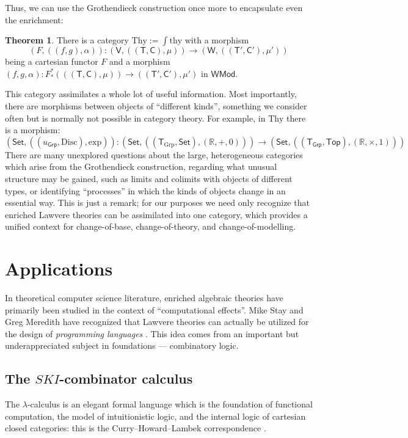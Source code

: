 \documentclass{amsart}
\theoremstyle{definition}
\newtheorem{theorem}{Theorem}
\newcommand{\Set}{\mathsf{Set}}
\newcommand{\Grp}{\mathsf{Grp}}
\newcommand{\Top}{\mathsf{Top}}
\newcommand{\Mod}{\mathsf{Mod}}
\newcommand{\V}{\mathsf{V}}
\newcommand{\W}{\mathsf{W}}
\newcommand{\C}{\mathsf{C}}
\newcommand{\T}{\mathsf{T}}
\newcommand{\maps}{\colon}
\begin{document}
Thus, we can use the Grothendieck construction once more to encapsulate even the enrichment:
\begin{theorem}
	There is a category $\mathrm{Thy} := \int \mathrm{thy}$ with a morphism $$(F,((f,g),\alpha))\maps (\V,((\T,\C),\mu)) \to (\W,((\T',\C'),\mu'))$$ being a cartesian functor $F$ and a morphism $(f,g,\alpha)\maps F_*^*(((\T,\C),\mu)) \to ((\T',\C'),\mu')$ in $\W\Mod$.
\end{theorem}

This category assimilates a whole lot of useful information. Most importantly, there are morphisms between objects of ``different kinds'', something we consider often but is normally not possible in category theory. For example, in $\mathrm{Thy}$ there is a morphism: 
\[ (\Set, ((u_{\Grp}, \mathrm{Disc}), \mathrm{exp}))\maps (\Set,((\T_{\mathrm{Grp}},\Set),(\mathbb{R},+,0))) \to (\Set,((\T_\Grp,\Top),(\mathbb{R},\times,1))) \]
There are many unexplored questions about the large, heterogeneous categories which arise from the Grothendieck construction, regarding what unusual structure may be gained, such as limits and colimits with objects of different types, or identifying ``processes'' in which the kinds of objects change in an essential way. This is just a remark; for our purposes we need only recognize that enriched Lawvere theories can be assimilated into one category, which provides a unified context for change-of-base, change-of-theory, and change-of-modelling.

\section{Applications}

In theoretical computer science literature, enriched algebraic theories have primarily been studied in the context of ``computational effects''. Mike Stay and Greg Meredith have recognized that Lawvere theories can actually be utilized for the design of \textit{programming languages} \cite{ladl}. This idea comes from an important but underappreciated subject in foundations --- combinatory logic.

\subsection{The $SKI$-combinator calculus}

The $\lambda$-calculus is an elegant formal language which is the foundation of functional computation, the model of intuitionistic logic, and the internal logic of cartesian closed categories: this is the Curry--Howard--Lambek correspondence \cite{baezstay}.
\end{document}
